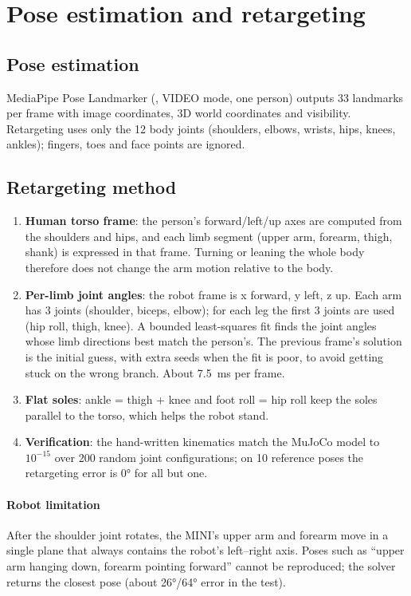 \documentclass[11pt,a4paper]{article}
\newcommand{\code}[1]{\texttt{\detokenize{#1}}}
\begin{document}
\section{Pose estimation and retargeting}

\subsection{Pose estimation}
MediaPipe Pose Landmarker (\code{pose_landmarker_full.task}, VIDEO mode, one person) outputs 33 landmarks per frame with image coordinates, 3D world coordinates and visibility. Retargeting uses only the 12 body joints (shoulders, elbows, wrists, hips, knees, ankles); fingers, toes and face points are ignored.

\subsection{Retargeting method}
\begin{enumerate}
  \item \textbf{Human torso frame}: the person's forward/left/up axes are computed from the shoulders and hips, and each limb segment (upper arm, forearm, thigh, shank) is expressed in that frame. Turning or leaning the whole body therefore does not change the arm motion relative to the body.
  \item \textbf{Per-limb joint angles}: the robot frame is x forward, y left, z up. Each arm has 3 joints (shoulder, biceps, elbow); for each leg the first 3 joints are used (hip roll, thigh, knee). A bounded least-squares fit finds the joint angles whose limb directions best match the person's. The previous frame's solution is the initial guess, with extra seeds when the fit is poor, to avoid getting stuck on the wrong branch. About 7.5~ms per frame.
  \item \textbf{Flat soles}: ankle = thigh + knee and foot roll = hip roll keep the soles parallel to the torso, which helps the robot stand.
  \item \textbf{Verification}: the hand-written kinematics match the MuJoCo model to $10^{-15}$ over 200 random joint configurations; on 10 reference poses the retargeting error is 0° for all but one.
\end{enumerate}

\paragraph{Robot limitation} After the shoulder joint rotates, the MINI's upper arm and forearm move in a single plane that always contains the robot's left--right axis. Poses such as ``upper arm hanging down, forearm pointing forward'' cannot be reproduced; the solver returns the closest pose (about 26°/64° error in the test).
\end{document}
